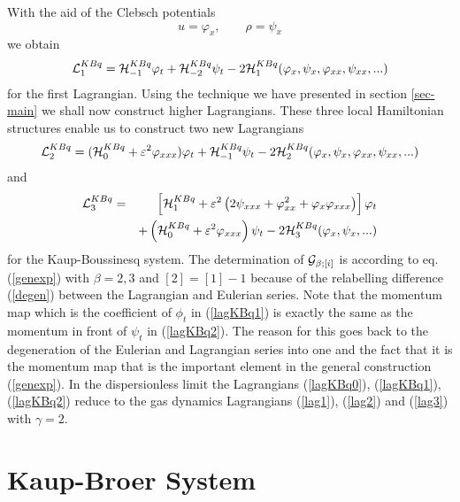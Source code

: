 \documentclass[a4paper,12pt]{article}
\begin{document}
With the aid of the Clebsch potentials
\begin{equation}
u = \varphi_x, \qquad \rho  =  \psi_x \label{potKBq1}
\end{equation}
we obtain
\begin{equation}
{\cal L}_{1}^{KBq} = {\cal H}_{-1}^{KBq} \varphi_{t}  + {\cal
H}_{-2}^{KBq} \psi_{t} - 2 {\cal H}_{1}^{KBq} (\varphi _{x},\psi
_{x},\varphi _{xx},\psi _{xx},...) \label{lagKBq0}
\end{equation}
for the first Lagrangian. Using the technique we have presented in
section \ref{sec-main} we shall now construct higher Lagrangians.
These three local Hamiltonian structures enable us to construct
two new Lagrangians
\begin{equation}
{\cal L}_{2}^{KBq} =( {\cal H}_{0}^{KBq} +\varepsilon ^{2}\varphi
_{xxx})\varphi _{t}+ {\cal H}_{-1}^{KBq} \psi _{t} - 2 {\cal
H}_{2}^{KBq}(\varphi _{x},\psi _{x},\varphi _{xx},\psi _{xx},...)
\label{lagKBq1}
\end{equation}
and
\begin{eqnarray}
{\cal L}_{3}^{KBq} & = & \left[  {\cal H}_{1}^{KBq} +\varepsilon
^{2} \left(  2 \psi_{xxx}+\varphi _{xx}^{2} + \varphi _{x}\varphi
_{xxx} \right) \right] \varphi_{t} \nonumber
\\ &&+ \left(  {\cal H}_{0}^{KBq} +\varepsilon^{2}\varphi_{xxx}
\right)\psi_{t} -2 {\cal H}_{3}^{KBq}(\varphi_{x},\psi _{x},...)
\label{lagKBq2}
\end{eqnarray}
for the Kaup-Boussinesq system. The determination of ${\cal
G}_{\beta ; [i]}$ is according to eq.(\ref{genexp}) with $\beta=
2, 3$ and $[2] = [1] -1$ because of the relabelling difference
(\ref{degen}) between the Lagrangian and Eulerian series. Note
that the momentum map which is the coefficient of $\phi_t$ in
(\ref{lagKBq1}) is exactly the same as the momentum in front of
$\psi_t$ in (\ref{lagKBq2}). The reason for this goes back to the
degeneration of the Eulerian and Lagrangian series into one and
the fact that it is the momentum map that is the important element
in the general construction (\ref{genexp}). In the dispersionless
limit the Lagrangians (\ref{lagKBq0}), (\ref{lagKBq1}),
(\ref{lagKBq2}) reduce to the gas dynamics Lagrangians
(\ref{lag1}), (\ref{lag2}) and (\ref{lag3}) with $\gamma=2$.

\section{Kaup-Broer System}
\end{document}
